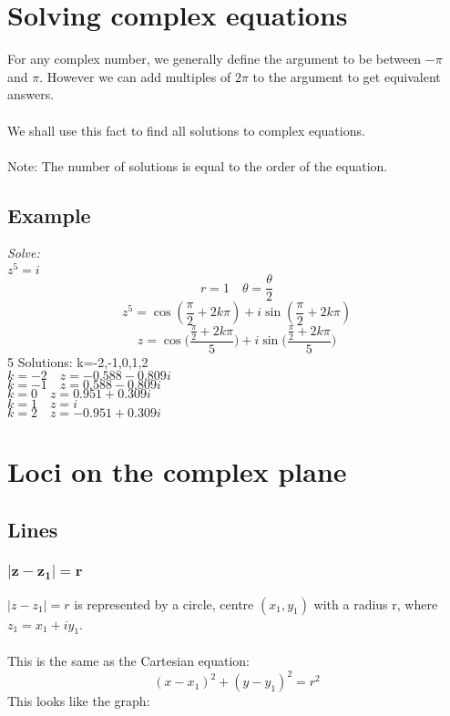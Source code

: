 \documentclass{article}[18pt]
\begin{document}
\section{Solving complex equations}
For any complex number, we generally define the argument to be between $-\pi$ and $\pi$. However we can add multiples of $2\pi$ to the argument to get equivalent answers.\\
\\
We shall use this fact to find all solutions to complex equations.\\
\\
Note: The number of solutions is equal to the order of the equation.
\subsection{Example}
\textit{Solve:}\\
$z^5=i$
$$r=1 \quad \theta=\frac{\theta}{2}$$
$$z^5=\cos(\frac{\pi}{2}+2k\pi)+i\sin(\frac{\pi}{2}+2k\pi)$$
$$z=\cos\Bigg(\frac{\frac{\pi}{2}+2k\pi}{5}
\Bigg)+i\sin\Bigg(\frac{\frac{\pi}{2}+2k\pi}{5}\Bigg)$$
5 Solutions: k=-2,-1,0,1,2\\
$k=-2 \quad z=-0.588-0.809i$\\
$k=-1 \quad z=0.588-0.809i$\\
$k=0 \quad z=0.951+0.309i$\\
$k=1 \quad z=i$\\
$k=2 \quad z=-0.951+0.309i$
\newpage
\section{Loci on the complex plane}
\subsection{Lines}
\subsubsection{$\mathbf{|z-z_1|=r}$}
$|z-z_1|=r$ is represented by a circle, centre $(x_1,y_1)$ with a radius r, where $z_1=x_1+iy_1$.\\
\\
This is the same as the Cartesian equation:
$$(x-x_1)^2+(y-y_1)^2=r^2$$
This looks like the graph:\\
\end{document}
